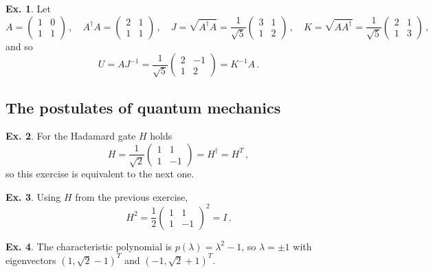 \documentclass[a4paper,12pt]{article}
\theoremstyle{definition}
\newtheorem{exercise}{Ex.}[section]
\begin{document}
\begin{exercise}
 Let
 \[
  A = \begin{pmatrix} 1 & 0 \\ 1 & 1 \end{pmatrix}\,,\quad
  A^\dagger A = \begin{pmatrix} 2 & 1 \\ 1 & 1 \end{pmatrix}\,,\quad J=\sqrt{A^\dagger A}=\frac{1}{\sqrt{5}}\begin{pmatrix} 3 & 1 \\ 1 & 2\end{pmatrix}\,,\quad
  K=\sqrt{AA^\dagger}=\frac{1}{\sqrt{5}}\begin{pmatrix}2 & 1\\ 1& 3\end{pmatrix}\,,
 \]
 and so
 \[
  U=A J^{-1}= \frac{1}{\sqrt{5}}\begin{pmatrix} 2 & -1 \\ 1 & 2\end{pmatrix}
  =K^{-1}A\,.
 \]
\end{exercise}

\subsection{The postulates of quantum mechanics}\label{ssec:thePostulatesOfQM}

\begin{exercise}
 For the Hadamard gate $H$ holds
 \[
  H=\frac{1}{\sqrt{2}}\begin{pmatrix}1 & 1 \\ 1 & -1 \end{pmatrix} = H^\dagger = H^T\,,
 \]
 so this exercise is equivalent to the next one.
\end{exercise}

\begin{exercise} Using $H$ from the previous exercise,
 \[
 H^2 = \frac{1}{2}\begin{pmatrix}1 & 1 \\ 1 & -1 \end{pmatrix}^2 = I\,.
 \]
\end{exercise}

\begin{exercise}
 The characteristic polynomial is $p(\lambda)=\lambda^2-1$, so $\lambda=\pm 1$ with eigenvectors $(1, \sqrt{2}-1)^T$ and $(-1, \sqrt{2}+1)^T$.
\end{exercise}
\end{document}
